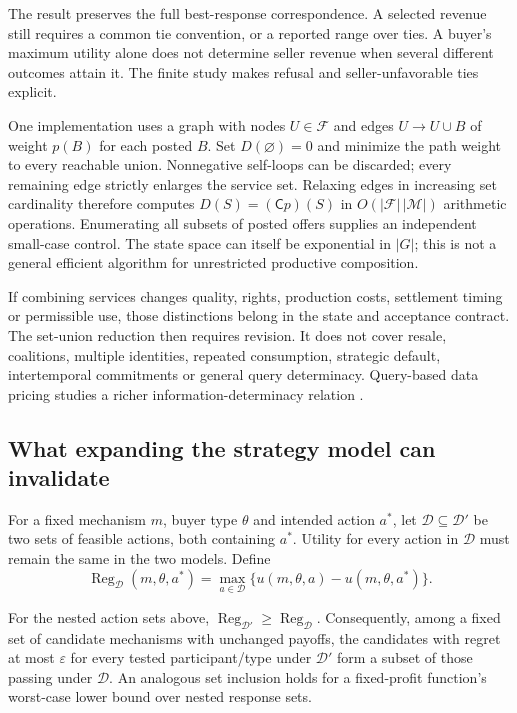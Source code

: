 The result preserves the full best-response correspondence. A selected revenue still requires a common tie convention, or a reported range over ties. A buyer's maximum utility alone does not determine seller revenue when several different outcomes attain it. The finite study makes refusal and seller-unfavorable ties explicit.

One implementation uses a graph with nodes $U\in\mathcal F$ and edges
$U\to U\cup B$ of weight $p(B)$ for each posted $B$. Set $D(\varnothing)=0$ and minimize the path weight to every reachable union. Nonnegative self-loops can be discarded; every remaining edge strictly enlarges the service set. Relaxing edges in increasing set cardinality therefore computes $D(S)=(\mathsf Cp)(S)$ in $O(|\mathcal F|\,|\mathcal M|)$ arithmetic operations. Enumerating all subsets of posted offers supplies an independent small-case control. The state space can itself be exponential in $|G|$; this is not a general efficient algorithm for unrestricted productive composition.

If combining services changes quality, rights, production costs, settlement timing or permissible use, those distinctions belong in the state and acceptance contract. The set-union reduction then requires revision. It does not cover resale, coalitions, multiple identities, repeated consumption, strategic default, intertemporal commitments or general query determinacy. Query-based data pricing studies a richer information-determinacy relation \cite{datapr}.

\subsection{What expanding the strategy model can invalidate}\label{app:strategy-expansion}

For a fixed mechanism $m$, buyer type $\theta$ and intended action $a^*$, let $\mathcal D\subseteq\mathcal D'$ be two sets of feasible actions, both containing $a^*$. Utility for every action in $\mathcal D$ must remain the same in the two models. Define
\[
\operatorname{Reg}_{\mathcal D}(m,\theta,a^*)
 =\max_{a\in\mathcal D}\{u(m,\theta,a)-u(m,\theta,a^*)\}.
\]

\begin{proposition}\label{prop:regret}
For the nested action sets above,
$\operatorname{Reg}_{\mathcal D'}\ge\operatorname{Reg}_{\mathcal D}$.
Consequently, among a fixed set of candidate mechanisms with unchanged payoffs, the candidates with regret at most $\varepsilon$ for every tested participant/type under $\mathcal D'$ form a subset of those passing under $\mathcal D$. An analogous set inclusion holds for a fixed-profit function's worst-case lower bound over nested response sets.
\end{proposition}


